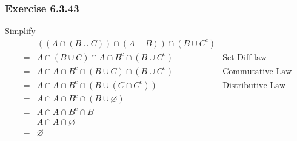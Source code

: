 \documentclass[12pt]{book}
\newcommand{\paren}[1]{\left( #1 \right)}
\begin{document}
    \subsubsection{Exercise 6.3.43}
        Simplify
        \begin{align*}
        &\paren{\paren{A \cap \paren{B \cup C}}\cap \paren{A - B}}\cap \paren{B \cup C^c}\\
        =&A \cap \paren{B \cup C} \cap A \cap B^c \cap \paren{B \cup C^c} & \text{Set Diff law}\\
        =&A \cap A\cap B^c \cap \paren{B \cup C} \cap \paren{B \cup C^c}& \text{Commutative Law}\\
        =&A \cap A \cap B^c \cap \paren{B \cup \paren{C \cap C^c}} & \text{Distributive Law}\\
        =&A \cap A \cap B^c \cap \paren{B \cup \varnothing} & \text{}\\
        =&A \cap A \cap B^c \cap B \\
        =&A \cap A \cap \varnothing \\
        =&\varnothing\\
        \end{align*}
\end{document}
